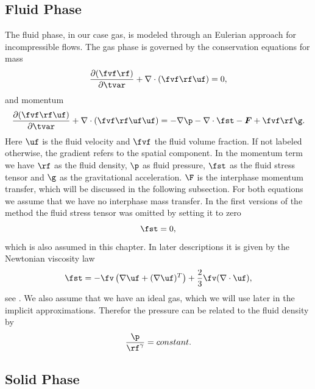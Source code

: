 \subsection{Fluid Phase}
The fluid phase, in our case gas, is modeled through an Eulerian approach for incompressible flows.
The gas phase is governed by the conservation equations for mass
\begin{equation}
    \dfrac{\partial (\fvf \rf)}{\partial \tvar} + \nabla \cdot (\fvf \rf \uf) = 0,
\end{equation}
and momentum
\begin{equation}
    \label{eq:momEul}
    \dfrac{\partial (\fvf \rf \uf)}{\partial \tvar} + \nabla \cdot (\fvf \rf \uf \uf) = - \nabla \p -\nabla \cdot \fst - \boldsymbol{F} + \fvf \rf \g.
\end{equation}
Here $\uf$ is the fluid velocity and $\fvf$ the fluid volume fraction.
If not labeled otherwise, the gradient refers to the spatial component.
In the momentum term
we have $\rf$ as the fluid density, $\p$ as fluid pressure, $\fst$ as the fluid stress tensor and $\g$ as the gravitational acceleration. $\F$ is the interphase momentum transfer, which will be discussed in the following subsection. 
For both equations we assume that we have no interphase mass transfer.
In the first versions of the \MP method the fluid stress tensor was omitted by setting it to zero
\begin{equation*}
    \fst = 0,
\end{equation*}
which is also assumed in this chapter.
In later \MP descriptions it is given by the Newtonian viscosity law
\begin{equation}
    \label{eq:fst}
    \fst = - \fv \left( \nabla \uf + ( \nabla \uf)^T \right) + \dfrac{2}{3} \fv ( \nabla \cdot \uf),
\end{equation}
see \cite{mathMPPIC}.
We also assume that we have an ideal gas, which we will use later in the implicit approximations. Therefor the pressure can be related to the fluid density by
\begin{equation}
\label{eq:gasDensReal}
    \dfrac{\p}{\rf^\gamma} = constant.
\end{equation}

\subsection{Solid Phase}

